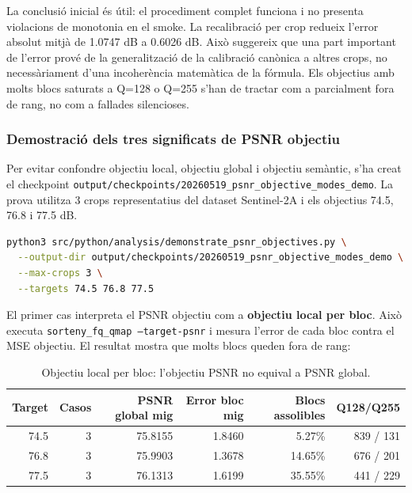 \documentclass[11pt,a4paper]{article}
\begin{document}
La conclusió inicial és útil: el procediment complet funciona i no presenta violacions de monotonia en el smoke. La recalibració per crop redueix l'error absolut mitjà de 1.0747 dB a 0.6026 dB. Això suggereix que una part important de l'error prové de la generalització de la calibració canònica a altres crops, no necessàriament d'una incoherència matemàtica de la fórmula. Els objectius amb molts blocs saturats a Q=128 o Q=255 s'han de tractar com a parcialment fora de rang, no com a fallades silencioses.

\subsubsection{Demostració dels tres significats de PSNR objectiu}

Per evitar confondre objectiu local, objectiu global i objectiu semàntic, s'ha creat el checkpoint \texttt{output/checkpoints/20260519\_psnr\_objective\_modes\_demo}. La prova utilitza 3 crops representatius del dataset Sentinel-2A i els objectius 74.5, 76.8 i 77.5 dB.

\begin{lstlisting}[language=bash]
python3 src/python/analysis/demonstrate_psnr_objectives.py \
  --output-dir output/checkpoints/20260519_psnr_objective_modes_demo \
  --max-crops 3 \
  --targets 74.5 76.8 77.5
\end{lstlisting}

El primer cas interpreta el PSNR objectiu com a \textbf{objectiu local per bloc}. Això executa \texttt{sorteny\_fq\_qmap --target-psnr} i mesura l'error de cada bloc contra el MSE objectiu. El resultat mostra que molts blocs queden fora de rang:

\begin{table}[H]
\centering
\begin{tabular}{rrrrrr}
\toprule
\textbf{Target} & \textbf{Casos} & \textbf{PSNR global mig} & \textbf{Error bloc mig} & \textbf{Blocs assolibles} & \textbf{Q128/Q255} \\
\midrule
74.5 & 3 & 75.8155 & 1.8460 & 5.27\% & 839 / 131 \\
76.8 & 3 & 75.9903 & 1.3678 & 14.65\% & 676 / 201 \\
77.5 & 3 & 76.1313 & 1.6199 & 35.55\% & 441 / 229 \\
\bottomrule
\end{tabular}
\caption{Objectiu local per bloc: l'objectiu PSNR no equival a PSNR global.}
\end{table}
\end{document}
